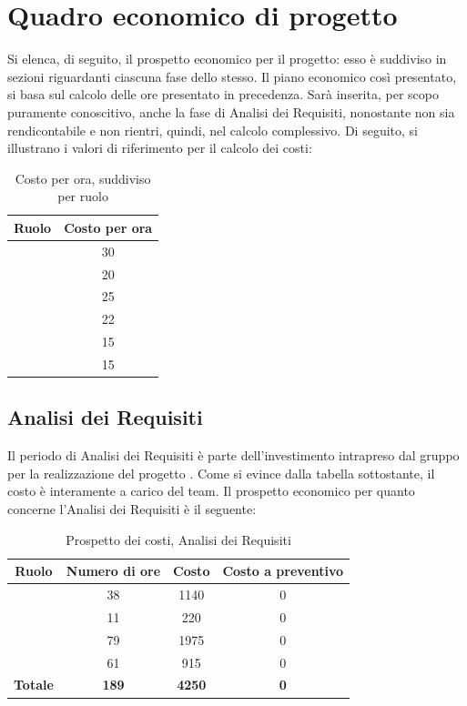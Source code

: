 \newpage

\section{Quadro economico di progetto}
Si elenca, di seguito, il prospetto economico per il progetto: esso è suddiviso in sezioni riguardanti ciascuna fase dello stesso. Il piano economico così presentato, si basa sul calcolo delle ore presentato in precedenza. Sarà inserita, per scopo puramente conoscitivo, anche la fase di Analisi dei Requisiti, nonostante non sia rendicontabile e non rientri, quindi, nel calcolo complessivo. Di seguito, si illustrano i valori di riferimento per il calcolo dei costi:

\begin{table}[H]
	\begin{center}
		\begin{tabular}{|c|c|}
			\hline
			\textbf{Ruolo}	& \textbf{Costo per ora} \\
			\hline
			\Res	&	30	\\
			\hline
			\Amm	&	20	\\
			\hline
			\Ana	&	25	\\
			\hline
			\Prog	&	22	\\
			\hline
			\Progr	&	15	\\
			\hline
			\Ver	&	15	\\
			\hline
		\end{tabular}
	\end{center}
	\caption{Costo per ora, suddiviso per ruolo}
\end{table}

\subsection{Analisi dei Requisiti}

Il periodo di Analisi dei Requisiti è parte dell'investimento intrapreso dal gruppo \textit{\gruppo} per la realizzazione del progetto \progetto. Come si evince dalla tabella sottostante, il costo è interamente a carico del team. Il prospetto economico per quanto concerne l'Analisi dei Requisiti è il seguente:


\begin{table}[H]
	\begin{center}
		\begin{tabular}{|c|c|c|c|}
			\hline
			\textbf{Ruolo}	& \textbf{Numero di ore} & \textbf{Costo} & \textbf{Costo a preventivo} \\
			\hline
			\Res	&	38  &	1140 &  0	\\
			\hline
			\Amm	&	11  &	220  &  0	\\
			\hline
			\Ana	&	79  &	1975 &  0	\\
			\hline
			\Ver	&	61  &	915 &  0	\\
			\hline
			\textbf{Totale}  &	\textbf{189}	& \textbf{4250}  &  \textbf{0}	\\
			\hline
		\end{tabular}
	\end{center}
	\caption{Prospetto dei costi, Analisi dei Requisiti }
\end{table}

